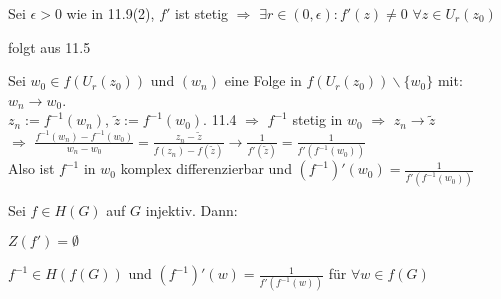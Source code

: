 \documentclass[a4paper,twoside,DIV15,BCOR12mm]{scrbook}
\begin{document}
\begin{beweis}
\begin{liste}
 \item Sei $\epsilon > 0$ wie in 11.9(2), $f'$ ist stetig $\Rightarrow$ $\exists
  r \in (0,\epsilon): f'(z) \neq 0$ $\forall z \in U_r(z_0)$
 \item folgt aus 11.5
 \item Sei $w_0 \in f(U_r(z_0))$ und $(w_n)$ eine Folge in $f(U_r(z_0)) \backslash
  \{w_0\}$ mit: $w_n \to w_0$. \\ $z_n := f^{-1}(w_n)$, $\tilde{z} := f^{-1}(w_0)$. 11.4 $\Rightarrow$
  $f^{-1}$ stetig in $w_0$ $\Rightarrow$ $z_n \to \tilde{z}$ \\
  $\Rightarrow$ $\frac{f^{-1}(w_n)-f^{-1}(w_0)}{w_n-w_0} =
  \frac{z_n-\tilde{z}}{f(z_n)-f(\tilde{z})} \to \frac{1}{f'(\tilde{z})}
  = \frac{1}{f'(f^{-1}(w_0))}$ \\
  Also ist $f^{-1}$ in $w_0$ komplex differenzierbar und $(f^{-1})'(w_0) =
  \frac{1}{f'(f^{-1}(w_0))}$ 
\end{liste}
\end{beweis}\begin{satz}Sei $f \in H(G)$ auf $G$ injektiv. Dann: 
	\begin{liste}
		\item $Z(f') = \emptyset$
		\item $f^{-1} \in H(f(G))$ und $(f^{-1})'(w) = \frac{1}{f'(f^{-1}(w))}$ für $\forall w \in f(G)$
	\end{liste}
\end{satz}
\end{document}
